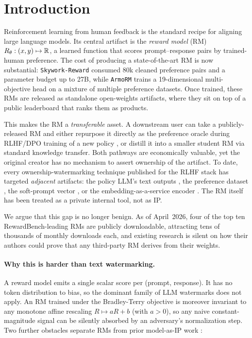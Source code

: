 \section{Introduction}
\label{sec:introduction}

Reinforcement learning from human feedback
\citep{ouyang2022training,bai2022training} is the standard recipe for
aligning large language models. Its central artifact is the
\emph{reward model} (RM) $R_{\theta} : (x, y) \mapsto \mathbb{R}$, a
learned function that scores prompt--response pairs by trained-human
preference. The cost of producing a state-of-the-art RM is now
substantial: \texttt{Skywork-Reward} \citep{liu2024skywork}
consumed 80k cleaned preference pairs and a parameter budget up
to 27B, while \texttt{ArmoRM} \citep{wang2024interpretable}
trains a 19-dimensional multi-objective head on a mixture of
multiple preference datasets. Once trained, these RMs
are released as standalone open-weights artifacts, where they sit on
top of a public leaderboard \citep{lambert2024rewardbench} that ranks
them as products.

This makes the RM a \emph{transferable} asset. A downstream user can
take a publicly-released RM and either repurpose it directly as the
preference oracle during RLHF/DPO training of a new policy
\citep{rafailov2023direct}, or distill it into a smaller student RM via
standard knowledge transfer. Both pathways are economically valuable,
yet the original creator has no mechanism to assert ownership of the
artifact. To date, every ownership-watermarking technique published for
the RLHF stack has targeted \emph{adjacent} artifacts: the policy LLM's
text outputs \citep{kirchenbauer2023watermark,christ2023undetectable},
the preference dataset \citep{lou2025prefercare}, the soft-prompt
vector \citep{yang2025promptcos}, or the embedding-as-a-service encoder
\citep{peng2023embmarker}. The RM itself has been treated as a private
internal tool, not as IP.

We argue that this gap is no longer benign. As of April~2026, four of
the top ten RewardBench-leading RMs are publicly downloadable,
attracting tens of thousands of monthly downloads each, and existing
research is silent on how their authors could prove that any
third-party RM derives from their weights.

\paragraph{Why this is harder than text watermarking.}
A reward model emits a single scalar score per (prompt, response).
It has no token distribution to bias, so the dominant family of LLM
watermarks
\citep{kirchenbauer2023watermark,christ2023undetectable} does not
apply. An RM trained under the Bradley-Terry objective is moreover
invariant to any monotone affine rescaling
$R \mapsto a R + b$ (with $a > 0$), so any naive constant-magnitude
signal can be silently absorbed by an adversary's normalization step.
Two further obstacles separate RMs from prior model-as-IP work
\citep{peng2023embmarker,xu2023warden,zhang2024vtune}:

